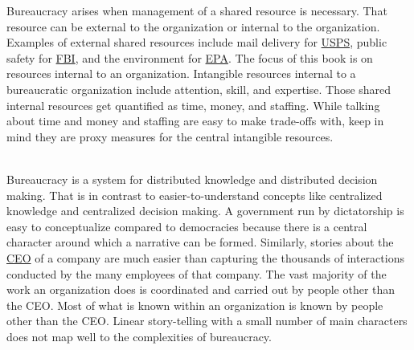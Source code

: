 Bureaucracy arises when management of a shared resource is necessary. That resource can be external to the organization or internal to the organization. Examples of external shared resources include mail delivery for \href{https://en.wikipedia.org/wiki/United_States_Postal_Service}{USPS}, 
public safety for \href{https://en.wikipedia.org/wiki/Federal_Bureau_of_Investigation}{FBI}, 
and the environment for \href{https://en.wikipedia.org/wiki/United_States_Environmental_Protection_Agency}{EPA}. 
The focus of this book is on resources internal to an organization. Intangible resources internal to a bureaucratic organization include attention, skill, and expertise. Those shared internal resources get quantified as time, money, and staffing. While talking about time and money and staffing are easy to make trade-offs with, keep in mind they are proxy measures for the central intangible resources.

\ \\

Bureaucracy is a system for distributed knowledge and distributed decision making. 
That is in contrast to easier-to-understand concepts like centralized knowledge and centralized decision making. A government run by dictatorship is easy to conceptualize compared to democracies because there is a central character around which a narrative can be formed. Similarly, stories about the \href{https://en.wikipedia.org/wiki/Chief_executive_officer}{CEO} 
of a company are much easier than capturing the thousands of interactions conducted by the many employees of that company. The vast majority of the work an organization does is coordinated and carried out by people other than the CEO. Most of what is known within an organization is known by people other than the CEO. Linear story-telling with a small number of main characters does not map well to the complexities of bureaucracy. 


